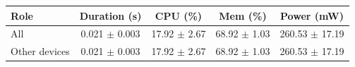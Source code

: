 \begin{tabular}{lcccc}
\hline
\textbf{Role} & \textbf{Duration (s)} & \textbf{CPU (\%)} & \textbf{Mem (\%)} & \textbf{Power (mW)} \\
\hline
All & 0.021 $\pm$ 0.003 & 17.92 $\pm$ 2.67 & 68.92 $\pm$ 1.03 & 260.53 $\pm$ 17.19 \\
Other devices & 0.021 $\pm$ 0.003 & 17.92 $\pm$ 2.67 & 68.92 $\pm$ 1.03 & 260.53 $\pm$ 17.19 \\
\hline
\end{tabular}
